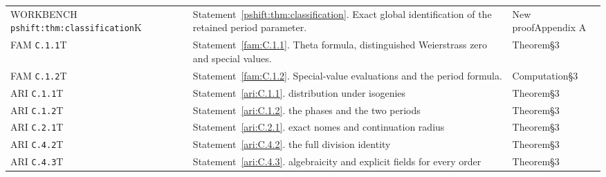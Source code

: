 \begin{longtable}{@{}L{.18\linewidth}L{.48\linewidth}L{.29\linewidth}@{}}
WORKBENCH \nolinkurl{pshift:thm:classification}\newline K & Statement~\ref{pshift:thm:classification}. Exact global identification of the retained period parameter.\newline {} & New proof\newline Appendix A\\
FAM \nolinkurl{C.1.1}\newline T & Statement~\ref{fam:C.1.1}. Theta formula, distinguished Weierstrass zero and special values.\newline {} & Theorem\newline §3\\
FAM \nolinkurl{C.1.2}\newline T & Statement~\ref{fam:C.1.2}. Special-value evaluations and the period formula.\newline {} & Computation\newline §3\\
ARI \nolinkurl{C.1.1}\newline T & Statement~\ref{ari:C.1.1}. distribution under isogenies\newline {} & Theorem\newline §3\\
ARI \nolinkurl{C.1.2}\newline T & Statement~\ref{ari:C.1.2}. the phases and the two periods\newline {} & Theorem\newline §3\\
ARI \nolinkurl{C.2.1}\newline T & Statement~\ref{ari:C.2.1}. exact nomes and continuation radius\newline {} & Theorem\newline §3\\
ARI \nolinkurl{C.4.2}\newline T & Statement~\ref{ari:C.4.2}. the full division identity\newline {} & Theorem\newline §3\\
ARI \nolinkurl{C.4.3}\newline T & Statement~\ref{ari:C.4.3}. algebraicity and explicit fields for every order\newline {} & Theorem\newline §3\\

\end{longtable}

